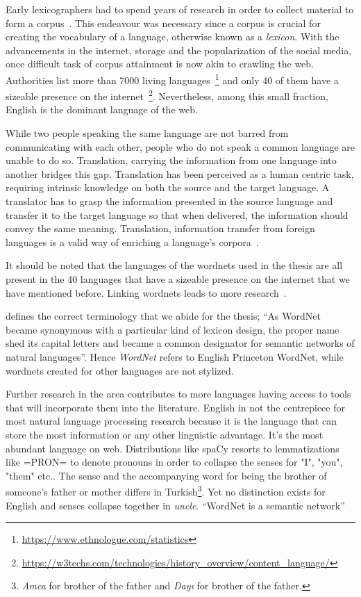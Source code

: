 Early lexicographers had to spend years of research in order to collect material to form a corpus~\cite{uzun_1945ten_1999}.
This endeavour was necessary since a corpus is crucial for creating the vocabulary of a language, otherwise known as a \emph{lexicon}.
With the advancements in the internet, storage and the popularization of the social media, once difficult task of corpus attainment is now akin to crawling the web.
Authorities list more than 7000 living languages~\footnote{\url{https://www.ethnologue.com/statistics}} and only 40 of them have a sizeable presence on the internet~\footnote{\url{https://w3techs.com/technologies/history_overview/content_language/}}.
Nevertheless, among this small fraction, English is the dominant language of the web.

While two people speaking the same language are not barred from communicating with each other, people who do not speak a common language are unable to do so.
Translation, carrying the information from one language into another bridges this gap.
Translation has been perceived as a human centric task, requiring intrinsic knowledge on both the source and the target language.
A translator has to grasp the information presented in the source language and transfer it to the target language so that when delivered, the information should convey the same meaning.
Translation, information transfer from foreign languages is a valid way of enriching a language's corpora~\cite{ibrahim_usta_turkce_2006}.

It should be noted that the languages of the wordnets used in the thesis are all present in the 40 languages that have a sizeable presence on the internet that we have mentioned before.
Linking wordnets leads to more research~\cite{sagot_building_2008}.

\textcite{fellbaum_semantic_1998} defines the correct terminology that we abide for the thesis; \enquote{As WordNet became synonymous with a particular kind of lexicon design, the proper name shed its capital letters and became a common designator for semantic networks of natural languages}.
Hence \emph{WordNet} refers to English Princeton WordNet, while wordnets created for other languages are not stylized.

Further research in the area contributes to more languages having access to tools that will incorporate them into the literature.
English in not the centrepiece for most natural language processing research because it is the language that can store the most information or any other linguistic advantage.
It's the most abundant language on web.
Distributions like spaCy resorts to lemmatizations like =PRON= to denote pronouns in order to collapse the senses for "I", "you", "them" etc.\@.
The sense and the accompanying word for being the brother of someone's father or mother differs in Turkish\footnote{\emph{Amca} for brother of the father and \emph{Dayı} for brother of the father.}.
Yet no distinction exists for English and senses collapse together in \emph{uncle}.
\enquote{WordNet is a semantic network}\cite{fellbaum_wordnet_1998-1}

